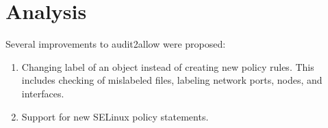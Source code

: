 
\chapter{Analysis}
Several improvements to audit2allow were proposed:
\begin{enumerate}
    \item Changing label of an object instead of creating new policy rules. This
        includes checking of mislabeled files, labeling network ports, nodes,
        and interfaces.
    \item Support for new SELinux policy statements.
\end{enumerate}

